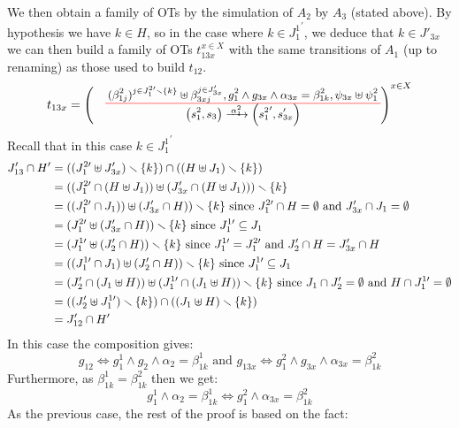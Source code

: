 \documentclass[runningheads]{llncs}
\begin{document}
\begin{enumerate}
We then obtain a family of OTs by the simulation of $A_2$ by $A_3$ (stated above).
By hypothesis we have $k \in H$, so in the case where $k \in {J^1_{1}}^{\prime}$, we deduce that $k \in J'_{3x}$ we can  then build  a family of OTs $t_{13x}^{x\in X}$ with the same transitions of $A_1$ (up to renaming) as those used to build $t_{12}$.
\[
t_{13x} = \left(\OT{\mpar{s^2_1, s_3}}{\mpar{{s^2_{1}}',s'_{3x}}}{\alpha^2_{1}}  {{(\beta^2_{1j})^{{j \in J^{2 \prime}_1} \setminus \{k\}}}\uplus \beta_{3xj}^{j \in J'_{3x}  } }{ g^2_1 \wedge  g_{3x}  \wedge \alpha_{3x} =  \beta^2_{1k}}{\psi_{3x} \uplus \psi^2_1}
\right)^{x\in X}\]
Recall that in this case  $k \in {J^1_{1}}^{\prime}$
\begin{align*}
J'_{13} \cap H'  
&=((J^{2 \prime}_{1} \uplus J'_{3x}) \smallsetminus {\left\{k\right\}}) \cap ((H\uplus J_1) \smallsetminus\{k\} )\\
& =((J^{2 \prime}_{1} \cap (H\uplus J_1)) \uplus (J'_{3x} \cap  (H\uplus J_1)))\smallsetminus {\left\{k\right\}}\\
& =((J^{2 \prime}_{1} \cap  J_1)) \uplus (J'_{3x} \cap H))\smallsetminus {\left\{k\right\}}\text{ since }  J^{2 \prime}_{1}\cap H = \emptyset \text{ and } J'_{3x}\cap J_1 = \emptyset  \\
& =(J^{2 \prime}_{1} \uplus (J'_{3x} \cap H))\smallsetminus {\left\{k\right\}} \text{ since } J^{1 \prime}_{1}\subseteq J_1\\
& =(J^{1 \prime}_{1} \uplus (J'_{2} \cap H))\smallsetminus {\left\{k\right\}}  \text{ since } J^{1 \prime}_{1}=J^{2 \prime}_{1} \text{ and } J'_2 \cap H = J'_{3x} \cap H\\
&  =((J^{1 \prime}_{1} \cap J_{1}) \uplus (J'_{2} \cap H))\smallsetminus {\left\{k\right\}} \text{ since } J^{1 \prime}_{1} \subseteq J_1 \\
& = (J'_{2} \cap (J_1 \uplus H)) \uplus (J^{1 \prime}_{1}\cap (J_1 \uplus H))\smallsetminus {\left\{k\right\}} \text{ since } 
J_1 \cap  J'_{2}= \emptyset \text{ and } H \cap J^{1 \prime}_{1} = \emptyset\\
& = ((J'_{2} \uplus J^{1 \prime}_{1})\smallsetminus {\left\{k\right\}}) \cap   ((J_1 \uplus H)\smallsetminus {\left\{k\right\}})\\
& = J'_{12}\cap H'
\end{align*}
In this case the composition gives:
\[g_{12} \Leftrightarrow g^1_1 \wedge g_2 \wedge \alpha_2=\beta^1_{1k} \text{ and } g_{13x}  \Leftrightarrow g^2_1 \wedge  g_{3x}  \wedge \alpha_{3x}=\beta^2_{1k}\] 
Furthermore, as $\beta^1_{1k} = \beta^2_{1k}$ then we get:
\[ g^1_1  \wedge \alpha_2=\beta^1_{1k}  \Leftrightarrow g^2_1  \wedge \alpha_{3x}=\beta^2_{1k}\]
As the previous case, the rest of the proof is based  on the fact:

\end{enumerate}
\end{document}
